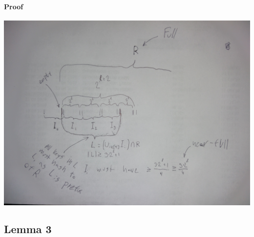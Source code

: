 \documentclass[a4paper, fleqn]{article}
\begin{document}
\paragraph{Proof}
\begin{center}
  \includegraphics[width=\textwidth]{./fig_1_8_linearProbing.jpg}
\end{center}
\subsection{Lemma 3}


\end{document}
